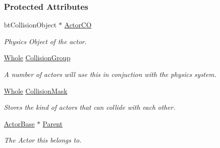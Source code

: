 \subsubsection*{Protected Attributes}
\begin{DoxyCompactItemize}
\item 
\hypertarget{classphys_1_1ActorBasePhysicsSettings_a259d4d10541b28d389ffa287f07ec916}{
btCollisionObject $\ast$ \hyperlink{classphys_1_1ActorBasePhysicsSettings_a259d4d10541b28d389ffa287f07ec916}{ActorCO}}
\label{classphys_1_1ActorBasePhysicsSettings_a259d4d10541b28d389ffa287f07ec916}

\begin{DoxyCompactList}\small\item\em Physics Object of the actor. \item\end{DoxyCompactList}\item 
\hypertarget{classphys_1_1ActorBasePhysicsSettings_a6a95b9dceba9a60f87b2ae0f3109b638}{
\hyperlink{namespacephys_a460f6bc24c8dd347b05e0366ae34f34a}{Whole} \hyperlink{classphys_1_1ActorBasePhysicsSettings_a6a95b9dceba9a60f87b2ae0f3109b638}{CollisionGroup}}
\label{classphys_1_1ActorBasePhysicsSettings_a6a95b9dceba9a60f87b2ae0f3109b638}

\begin{DoxyCompactList}\small\item\em A number of actors will use this in conjuction with the physics system. \item\end{DoxyCompactList}\item 
\hypertarget{classphys_1_1ActorBasePhysicsSettings_ae5f0c41d16868bf67e834b643207521f}{
\hyperlink{namespacephys_a460f6bc24c8dd347b05e0366ae34f34a}{Whole} \hyperlink{classphys_1_1ActorBasePhysicsSettings_ae5f0c41d16868bf67e834b643207521f}{CollisionMask}}
\label{classphys_1_1ActorBasePhysicsSettings_ae5f0c41d16868bf67e834b643207521f}

\begin{DoxyCompactList}\small\item\em Stores the kind of actors that can collide with each other. \item\end{DoxyCompactList}\item 
\hypertarget{classphys_1_1ActorBasePhysicsSettings_a2bd46cc0b9e675c409d5e09772126030}{
\hyperlink{classphys_1_1ActorBase}{ActorBase} $\ast$ \hyperlink{classphys_1_1ActorBasePhysicsSettings_a2bd46cc0b9e675c409d5e09772126030}{Parent}}
\label{classphys_1_1ActorBasePhysicsSettings_a2bd46cc0b9e675c409d5e09772126030}

\begin{DoxyCompactList}\small\item\em The Actor this belongs to. \item\end{DoxyCompactList}\end{DoxyCompactItemize}


